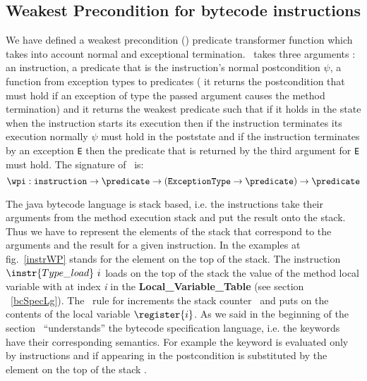\subsection{Weakest Precondition for bytecode instructions}\label{wpInstr}
We have defined a weakest precondition (\wpi) predicate transformer function which takes into account normal and exceptional termination. 
\wpi \ takes three arguments : an instruction, a predicate that is the instruction's normal postcondition $\psi$, a function
from exception types to predicates ( it returns the postcondition that  must hold if an exception of type the passed argument
 causes the method termination)  and it returns the weakest predicate such that if it holds in the state when the instruction starts its 
 execution then if the instruction terminates its execution normally  $\psi$ must hold in the poststate and if the instruction terminates
 by an exception \texttt{E} then the predicate that is returned by the third argument for \texttt{E} must hold. The signature of \ \wpi is:
$$\wpi : \texttt{instruction} \rightarrow \predicate \rightarrow (\tt{ ExceptionType} \rightarrow  \predicate) \rightarrow \predicate   $$

 The java bytecode language is stack based, i.e.  the instructions take their arguments from the method execution stack and 
 put the result onto the stack. Thus we have to represent the elements of the stack that correspond to the arguments and the result for a given instruction. 
 In the examples at fig.~\ref{instrWP} \stack{\counter} stands for the element on the top of the stack. 
 The instruction $\instr{Type\_load} \ i$  loads on the top of the stack the value of the method local variable with at index \textit{i}
 in the \textbf{Local\_Variable\_Table} (see section ~\ref{bcSpecLg}). The \wpi \ rule for   increments the stack
counter \counter \ and puts on \stack{\counter} the contents of the local variable $\register{i}$.
As we said in the beginning of the section \wpi \ ``understands'' the bytecode specification language, i.e. the keywords have their 
corresponding semantics. For example the keyword  is evaluated only by  
instructions and if appearing in the postcondition   is substituted by the element on the top of 
the stack \stack{\counter}. 

